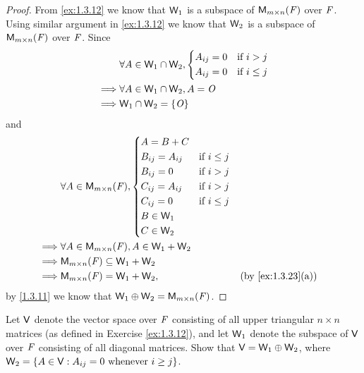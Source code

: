 \begin{proof}
  From \cref{ex:1.3.12} we know that \(\mathsf{W}_1\) is a subspace of \(\mathsf{M}_{{m} \times n}({\mathit{F}})\) over \(\mathit{F}\).
  Using similar argument in \cref{ex:1.3.12} we know that \(\mathsf{W}_2\) is a subspace of \(\mathsf{M}_{{m} \times n}({\mathit{F}})\) over \(\mathit{F}\).
  Since
  \begin{align*}
             & \forall A \in \mathsf{W}_1 \cap \mathsf{W}_2, \begin{dcases}
      A_{i j} = 0 & \text{if } i > j    \\
      A_{i j} = 0 & \text{if } i \leq j
    \end{dcases} \\
    \implies & \forall A \in \mathsf{W}_1 \cap \mathsf{W}_2, A = \mathit{O}                    \\
    \implies & \mathsf{W}_1 \cap \mathsf{W}_2 = \left\lbrace\mathit{O}\right\rbrace
  \end{align*}
  and
  \begin{align*}
             & \forall A \in \MS, \begin{dcases}
      A = B + C                               \\
      B_{i j} = A_{i j} & \text{if } i \leq j \\
      B_{i j} = 0       & \text{if } i > j    \\
      C_{i j} = A_{i j} & \text{if } i > j    \\
      C_{i j} = 0       & \text{if } i \leq j \\
      B \in \W_1                              \\
      C \in \W_2
    \end{dcases}                                      \\
    \implies & \forall A \in \MS, A \in \W_1 + \W_2                                               \\
    \implies & \MS \subseteq \W_1 + \W_2                                                          \\
    \implies & \MS = \W_1 + \W_2,                            &  & \text{(by \cref{ex:1.3.23}(a))}
  \end{align*}
  by \cref{1.3.11} we know that \(\mathsf{W}_1 \oplus \mathsf{W}_2 = \mathsf{M}_{{m} \times n}({\mathit{F}})\).
\end{proof}

\begin{ex}\label{ex:1.3.27}
  Let \(\mathsf{V}\) denote the vector space over \(\mathit{F}\) consisting of all upper triangular \(n \times n\) matrices (as defined in Exercise \cref{ex:1.3.12}), and let \(\mathsf{W}_1\) denote the subspace of \(\mathsf{V}\) over \(\mathit{F}\) consisting of all diagonal matrices.
  Show that \(\mathsf{V} = \mathsf{W}_1 \oplus \mathsf{W}_2\), where \(\mathsf{W}_2 = \left\lbrace A \in \mathsf{V} : A_{i j} = 0 \text{ whenever } i \geq j\right\rbrace\).
\end{ex}

